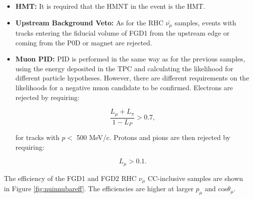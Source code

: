 \begin{itemize}

\item \textbf{HMT:} It is required that the HMNT  in the event is the HMT.

\item \textbf{Upstream Background Veto:} As for the RHC $\bar{\nu_{\mu}}$ samples, events with tracks entering the fiducial volume of FGD1 from the upstream edge or coming from the P0D or magnet are rejected.

\item \textbf{Muon PID:} PID is performed in the same way as for the previous samples, using the energy deposited in the TPC and calculating the likelihood for different particle hypotheses. However, there are different requirements on the likelihoods for a negative muon candidate to be confirmed. Electrons are rejected by requiring:

\begin{equation}
\frac{L_{\mu}+L_{\pi}}{1-L_P} > 0.7,
\end{equation}

for tracks with  $p <$ 500 MeV/c. Protons and pions are then rejected by requiring:

\begin{equation}
L_{\mu} > 0.1.
\end{equation}

\end{itemize}

The efficiency of the FGD1 and FGD2 RHC $\nu_{\mu}$ CC-inclusive samples are shown in Figure \ref{fig:nuinnubareff}. The efficiencies are higher at larger $p_{\mu}$ and cos$\theta_{\mu}$.

